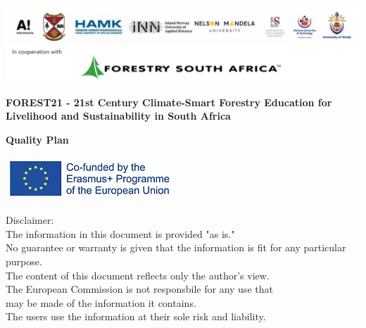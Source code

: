 \documentclass[
  11pt,
]{article}
\author{}
\date{\vspace{-2.5em}}
\begin{document}
\subsectionfont{\raggedright}
\subsubsectionfont{\raggedright}

\thispagestyle{empty}

\begin{centering}

\vspace{3cm}


\includegraphics[width=1\linewidth]{Partner_logos} 

\vspace{3cm}

\Large
{\bf FOREST21 - 21st Century Climate-Smart Forestry Education for Livelihood
  and Sustainability in South Africa}
  
\vspace{2cm}

\Large
{\bf Quality Plan}

\vspace{4cm}

\normalsize
\singlespacing


\includegraphics[width=1\linewidth]{EU_logo} 

\vspace{0.5 cm}

Disclaimer:\\
The information in this document is provided "as is."\\
No guarantee or warranty is given that the information is fit for any particular purpose.\\
The content of this document reflects only the author's view.\\
The European Commission is not responsbile for any use that\\
may be made of the information it contains.\\
The users use the information at their sole risk and liability.

\vspace{1.5 cm}

\end{centering}
\end{document}
